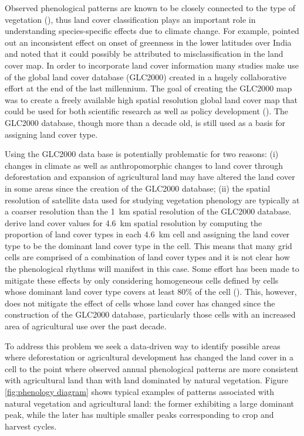 Observed phenological patterns are known to be closely connected to the type of vegetation (\cite{Dash:2010kva}), thus land cover classification plays an important role in understanding species-specific effects due to climate change. For example, \cite{Dash:2010kva} pointed out an inconsistent effect on onset of greenness in the lower latitudes over India and noted that it could possibly be attributed to misclassification in the land cover map. In order to incorporate land cover information many studies make use of the global land cover database (GLC2000) created in a hugely collaborative effort at the end of the last millennium. The goal of creating the GLC2000 map was to create a freely available high spatial resolution global land cover map that could be used for both scientific research as well as policy development (\cite{Bartholome:2005cq}). The GLC2000 database, though more than a decade old, is still used as a basis for assigning land cover type. 

Using the GLC2000 data base is potentially problematic for two reasons: (i) changes in climate as well as anthropomorphic changes to land cover through deforestation and expansion of agricultural land may have altered the land cover in some areas since the creation of the GLC2000 database; (ii) the spatial resolution of satellite data used for studying vegetation phenology are typically at a coarser resolution than the 1~km spatial resolution of the GLC2000 database. \cite{Dash:2010kva} derive land cover values for 4.6~km spatial resolution by computing the proportion of land cover types in each 4.6~km cell and assigning the land cover type to be the dominant land cover type in the cell. This means that many grid cells are comprised of a combination of land cover types and it is not clear how the phenological rhythms will manifest in this case. Some effort has been made to mitigate these effects by only considering homogeneous cells defined by cells whose dominant land cover type covers at least 80\% of the cell (\cite{Jeganathan:2010gqa}). This, however, does not mitigate the effect of cells whose land cover has changed since the construction of the GLC2000 database, particularly those cells with an increased area of agricultural use over the past decade. 

To address this problem we seek a data-driven way to identify possible areas where deforestation or agricultural development has changed the land cover in a cell to the point where observed annual phenological patterns are more consistent with agricultural land than with land dominated by natural vegetation. Figure \ref{fig:phenology diagram} shows typical examples of patterns associated with natural vegetation and agricultural land: the former exhibiting a large dominant peak, while the later has multiple smaller peaks corresponding to crop and harvest cycles. 

